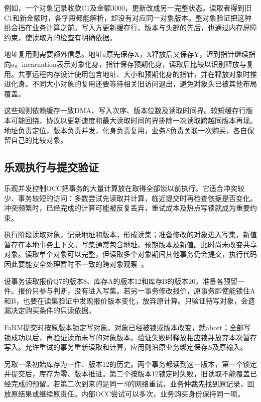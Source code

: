 
例如，一个对象记录收款C1及金额3000，更新改成另一完整状态。读取者得到旧C1和新金额时，各字段都能解析，却没有对应同一对象版本。整对象验证把这种组合挡在业务计算之前。写入方更新缓存行、版本与头部的先后，也通过内存屏障约束，使读取方的检查有明确依据。

地址复用则需要额外信息。地址$a$原先保存X，X释放后又保存Y，迟到指针继续指向$a$。incarnation表示对象化身，指针保存预期化身，读取后比较以识别释放与复用。共享远程内存设计使用包含地址、大小和预期化身的指针，并在释放对象时推进化身。不同大小对象的复用还要等待相关旧访问退出，避免对象头已被其他布局覆盖。

这些规则依赖缓存一致DMA、写入次序、版本位数及读取时间界。较短缓存行版本可能回绕，协议以更新速度和最大读取时间的界排除一次读取跨越同版本再现。地址负责定位，版本负责并发，化身负责复用，业务$S$负责关联一次购买，各自保留自己的比较对象。

\subsection{乐观执行与提交验证}

乐观并发控制OCC把事务的大量计算放在取得全部锁以前执行。它适合冲突较少、事务较短的访问：多数尝试先读取并计算，临近提交时再检查依据是否变化。冲突频繁时，已经完成的计算可能被反复丢弃，重试成本及热点写锁就成为重要约束。

执行阶段读取对象，记录地址和版本，形成读集；准备修改的对象进入写集，新值暂存在本地事务上下文。写集通常包含地址、预期版本及新值。此时尚未改变共享对象。读取单个对象可以完整，但读取多个对象期间其他事务仍会提交，执行代码因此要能安全处理暂时不一致的跨对象观察~\cite{farm2015}。


设事务读取报价Q7的版本8、库存A的版本12和库存B的版本20，准备各预留一件。报价只参与判断，没有进入写集。若另一事务修改报价，原事务即使能锁住A和B，也要在读集验证中发现报价版本变化，放弃原计算。只验证待写对象，会遗漏决定购买条件的只读依据。

FaRM提交时按原版本锁定写对象。对象已经被锁或版本改变，就abort；全部写锁成功以后，再验证读而未写的对象版本。验证失败时释放相应锁并放弃本次暂存写入。允许重试的事务重新读取和计算，应用则沿原业务绑定保存$S$及原输入。

另取一条初始库存为一件、版本12的历史。两个事务都读到这一版本，第一个锁定并提交后，库存为零、版本推进。第二个按版本12锁定时失败，旧读取不能覆盖已经完成的预留。若第二次到来的是同一$S$的网络重试，业务仲裁先找到原记录，回放原结果或继续原责任。内部OCC尝试可以多次，业务购买身份保持同一项。

